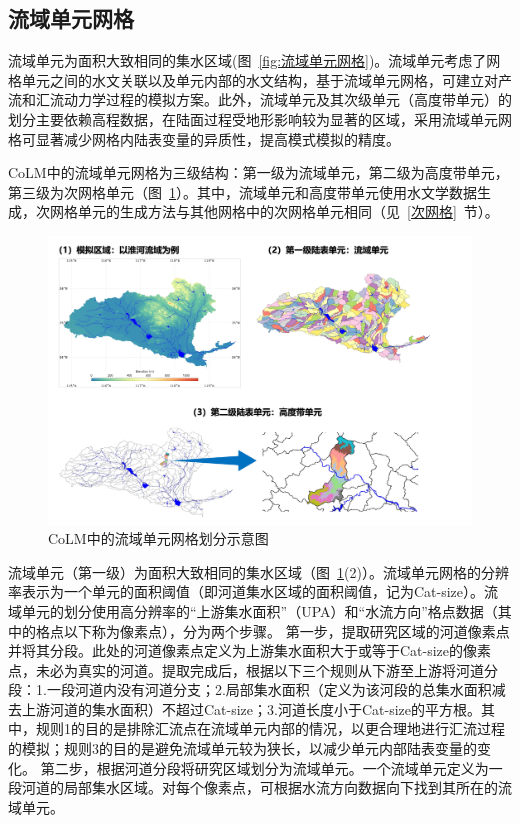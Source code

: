 \subsection{流域单元网格}\label{流域单元网格}
流域单元为面积大致相同的集水区域(图~\ref{fig:流域单元网格})。流域单元考虑了网格单元之间的水文关联以及单元内部的水文结构，基于流域单元网格，可建立对产流和汇流动力学过程的模拟方案。此外，流域单元及其次级单元（高度带单元）的划分主要依赖高程数据，在陆面过程受地形影响较为显著的区域，采用流域单元网格可显著减少网格内陆表变量的异质性，提高模式模拟的精度。

CoLM中的流域单元网格为三级结构：第一级为流域单元，第二级为高度带单元，第三级为次网格单元（图~\ref{fig:流域单元示意图}）。其中，流域单元和高度带单元使用水文学数据生成，次网格单元的生成方法与其他网格中的次网格单元相同（见~\ref{次网格}~节）。

{
  \begin{figure}[htbp]
    \centering
    \includegraphics[width=\textwidth]{Figures/模式构架/流域单元示意图.jpg}
    \caption{CoLM中的流域单元网格划分示意图}
    \label{fig:流域单元示意图}
  \end{figure}
}

流域单元（第一级）为面积大致相同的集水区域（图~\ref{fig:流域单元示意图}(2)）。流域单元网格的分辨率表示为一个单元的面积阈值（即河道集水区域的面积阈值，记为Cat-size）。流域单元的划分使用高分辨率的“上游集水面积”（UPA）和“水流方向”格点数据（其中的格点以下称为像素点），分为两个步骤。
第一步，提取研究区域的河道像素点并将其分段。此处的河道像素点定义为上游集水面积大于或等于Cat-size的像素点，未必为真实的河道。提取完成后，根据以下三个规则从下游至上游将河道分段：1.一段河道内没有河道分支；2.局部集水面积（定义为该河段的总集水面积减去上游河道的集水面积）不超过Cat-size；3.河道长度小于Cat-size的平方根。其中，规则1的目的是排除汇流点在流域单元内部的情况，以更合理地进行汇流过程的模拟；规则3的目的是避免流域单元较为狭长，以减少单元内部陆表变量的变化。
第二步，根据河道分段将研究区域划分为流域单元。一个流域单元定义为一段河道的局部集水区域。对每个像素点，可根据水流方向数据向下找到其所在的流域单元。

